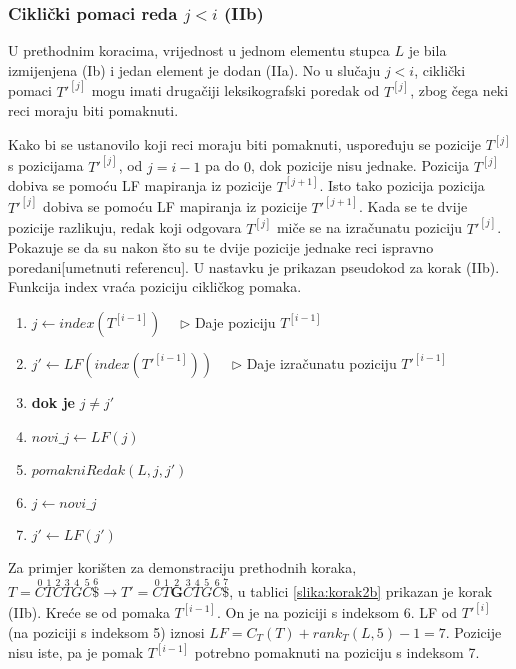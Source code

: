 \documentclass{ferseminar}
\begin{document}
\subsubsection{Ciklički pomaci reda $j<i$ (IIb)}
U prethodnim koracima, vrijednost u jednom elementu stupca $L$ je bila izmijenjena (Ib) i jedan element je dodan (IIa). No u slučaju $j<i$, ciklički pomaci $T'^[j]$ mogu imati drugačiji leksikografski poredak od $T^{[j]}$, zbog čega neki reci moraju biti pomaknuti.

Kako bi se ustanovilo koji reci moraju biti pomaknuti, uspoređuju se pozicije $T^{[j]}$ s pozicijama $T'^{[j]}$, od $j=i-1$ pa do $0$, dok pozicije nisu jednake. Pozicija $T^{[j]}$ dobiva se pomoću LF mapiranja iz pozicije $T^{[j+1]}$. Isto tako pozicija pozicija $T'^{[j]}$ dobiva se pomoću LF mapiranja iz pozicije $T'^{[j+1]}$. Kada se te dvije pozicije razlikuju, redak koji odgovara $T^{[j]}$ miče se na izračunatu poziciju $T'^{[j]}$. Pokazuje se da su nakon što su te dvije pozicije jednake reci ispravno poredani[umetnuti referencu].
U nastavku je prikazan pseudokod za korak (IIb). Funkcija index vraća poziciju cikličkog pomaka.
\footnotesize
\begin{enumerate}
	\item $j\longleftarrow index(T^{[i-1]}) \quad$ $\triangleright$ Daje poziciju $T^{[i-1]}$
	\item $j'\longleftarrow LF(index(T'^{[i-1]})) \quad$ $\triangleright$ Daje izračunatu poziciju $T'^{[i-1]}$
	\item \textbf{dok je} $j\neq j'$
	\item \hspace{.1\textwidth} $novi\_j \longleftarrow LF(j) $
	\item \hspace{.1\textwidth} $pomakniRedak(L,j,j')$
	\item \hspace{.1\textwidth} $j \longleftarrow novi\_j $
	\item \hspace{.1\textwidth} $j' \longleftarrow LF(j') $
\end{enumerate}
\normalsize

Za primjer korišten za demonstraciju prethodnih koraka, $
	T=\overset{0}{C}	\overset{1}{T} \overset{2}{C} \overset{3}{T}	\overset{4}{G}
	\overset{5}{C}	\overset{6}{\$} \rightarrow		
	T'=\overset{0}{C}	\overset{1}{T}	\overset{2}{\boldsymbol{G}}  \overset{3}{C} \overset{4}{T}	\overset{5}{G}
	\overset{6}{C}	\overset{7}{\$} 	
$, u tablici \ref{slika:korak2b} prikazan je korak (IIb). Kreće se od pomaka $T^{[i-1]}$. On je na poziciji s indeksom 6. LF od $T'^{[i]}$ (na poziciji s indeksom 5) iznosi $LF=C_T(T)+rank_T(L,5)-1=7$. Pozicije nisu iste, pa je pomak $T^{[i-1]}$ potrebno pomaknuti na poziciju s indeksom 7.
\end{document}
